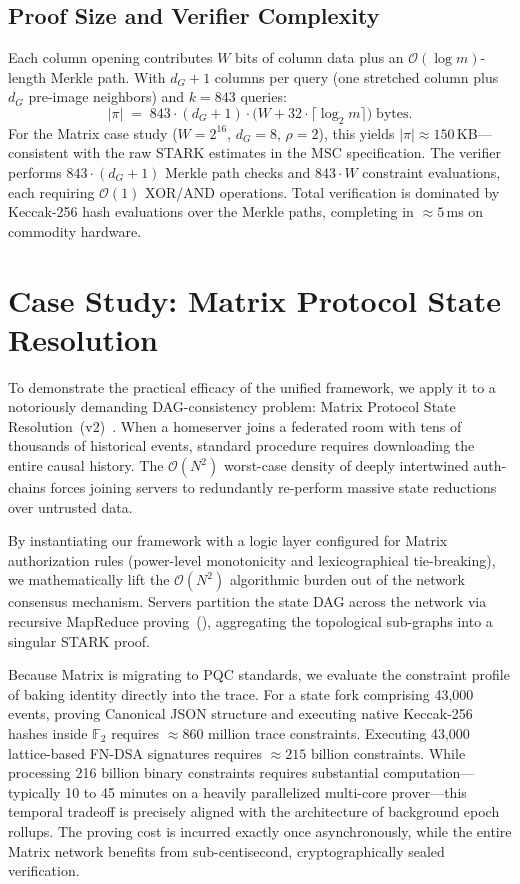 \documentclass[11pt,a4paper]{article}
\begin{document}
\subsection{Proof Size and Verifier Complexity}

Each column opening contributes $W$ bits of column data plus an
$\mathcal{O}(\log m)$-length Merkle path.  With $d_G + 1$ columns
per query (one stretched column plus $d_G$ pre-image neighbors)
and $k = 843$ queries:
\[
  |\pi| \;=\; 843 \cdot (d_G + 1) \cdot
  \bigl(W + 32 \cdot \lceil\log_2 m\rceil\bigr)
  \;\text{bytes}.
\]
For the Matrix case study ($W = 2^{16}$, $d_G = 8$, $\rho = 2$),
this yields $|\pi| \approx 150$\,KB---consistent with the raw
STARK estimates in the MSC specification.  The verifier performs
$843 \cdot (d_G + 1)$ Merkle path checks and
$843 \cdot W$ constraint evaluations, each requiring
$\mathcal{O}(1)$ XOR/AND operations.  Total verification is
dominated by Keccak-256 hash evaluations over the Merkle paths,
completing in $\approx 5$\,ms on commodity hardware.


\section{Case Study: Matrix Protocol State Resolution}\label{sec:matrix}

To demonstrate the practical efficacy of the unified framework, we
apply it to a notoriously demanding DAG-consistency problem: Matrix
Protocol State Resolution~(v2)~\cite{matrix-spec}.  When a
homeserver joins a federated room with tens of thousands of
historical events, standard procedure requires downloading the
entire causal history.  The $\mathcal{O}(N^2)$ worst-case density of
deeply intertwined auth-chains forces joining servers to redundantly
re-perform massive state reductions over untrusted data.

By instantiating our framework with a logic layer configured for
Matrix authorization rules (power-level monotonicity and
lexicographical tie-breaking), we mathematically lift the
$\mathcal{O}(N^2)$ algorithmic burden out of the network consensus
mechanism.  Servers partition the state DAG across the network via
recursive MapReduce proving~(), aggregating the
topological sub-graphs into a singular STARK proof.

Because Matrix is migrating to PQC standards, we evaluate the
constraint profile of baking identity directly into the trace.  For
a state fork comprising 43{,}000 events, proving Canonical JSON
structure and executing native Keccak-256 hashes inside
$\mathbb{F}_2$ requires $\approx 860$ million trace constraints.
Executing 43{,}000 lattice-based FN-DSA signatures requires
$\approx 215$ billion constraints.  While processing 216 billion
binary constraints requires substantial computation---typically 10
to 45 minutes on a heavily parallelized multi-core prover---this
temporal tradeoff is precisely aligned with the architecture of
background epoch rollups.  The proving cost is incurred exactly once
asynchronously, while the entire Matrix network benefits from
sub-centisecond, cryptographically sealed verification.
\end{document}
